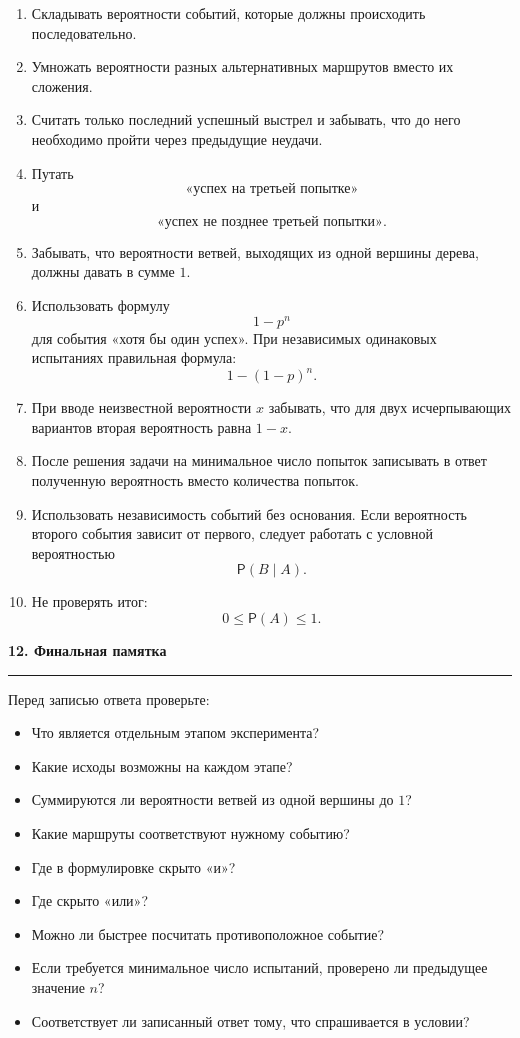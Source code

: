 \documentclass[a4paper,12pt]{article}
\newcommand{\Prob}{\mathsf{P}}
\newcommand{\topichead}[1]{%
  \vspace{0.5em}
  {\Large\bfseries\color{darkaccent}#1\par}
  \vspace{0.35em}
  {\color{accent}\rule{\linewidth}{0.7pt}}
  \vspace{0.5em}
}
\begin{document}
\begin{enumerate}[label=\arabic*)]
\item Складывать вероятности событий, которые должны происходить
последовательно.

\item Умножать вероятности разных альтернативных маршрутов вместо их сложения.

\item Считать только последний успешный выстрел и забывать, что до него
необходимо пройти через предыдущие неудачи.

\item Путать
\[
\text{«успех на третьей попытке»}
\]
и
\[
\text{«успех не позднее третьей попытки»}.
\]

\item Забывать, что вероятности ветвей, выходящих из одной вершины дерева,
должны давать в сумме $1$.

\item Использовать формулу
\[
1-p^n
\]
для события «хотя бы один успех».
При независимых одинаковых испытаниях правильная формула:
\[
1-(1-p)^n.
\]

\item При вводе неизвестной вероятности $x$ забывать, что для двух
исчерпывающих вариантов вторая вероятность равна $1-x$.

\item После решения задачи на минимальное число попыток записывать в ответ
полученную вероятность вместо количества попыток.

\item Использовать независимость событий без основания.
Если вероятность второго события зависит от первого, следует работать с
условной вероятностью
\[
\Prob(B\mid A).
\]

\item Не проверять итог:
\[
0\le\Prob(A)\le1.
\]
\end{enumerate}


\topichead{12. Финальная памятка}

Перед записью ответа проверьте:

\begin{itemize}
\item Что является отдельным этапом эксперимента?
\item Какие исходы возможны на каждом этапе?
\item Суммируются ли вероятности ветвей из одной вершины до $1$?
\item Какие маршруты соответствуют нужному событию?
\item Где в формулировке скрыто «и»?
\item Где скрыто «или»?
\item Можно ли быстрее посчитать противоположное событие?
\item Если требуется минимальное число испытаний, проверено ли предыдущее
значение $n$?
\item Соответствует ли записанный ответ тому, что спрашивается в условии?
\end{itemize}
\end{document}
